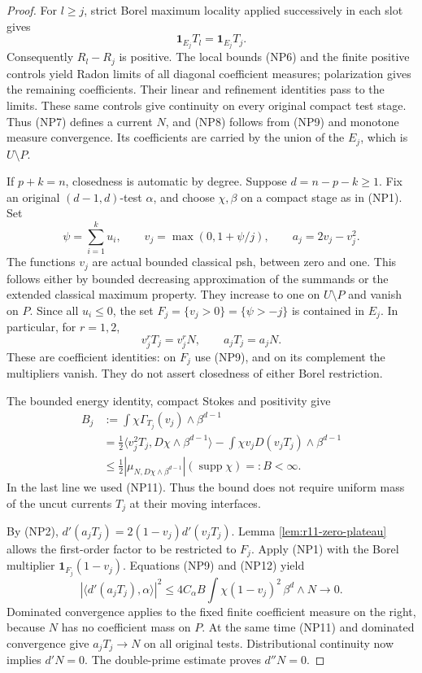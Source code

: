 \begin{proof}
For $l\geq j$, strict Borel maximum locality applied successively in
each slot gives
\[
                       \mathbf1_{E_j}T_l=\mathbf1_{E_j}T_j.
 \tag{NP9}
\]
Consequently $R_l-R_j$ is positive.  The local bounds (NP6) and the
finite positive controls yield Radon limits of all diagonal coefficient
measures; polarization gives the remaining coefficients.  Their linear
and refinement identities pass to the limits.  These same controls
give continuity on every original compact test stage.  Thus (NP7)
defines a current $N$, and (NP8) follows from (NP9) and monotone
measure convergence.  Its coefficients are carried by the union
of the $E_j$, which is $U\setminus P$.

If $p+k=n$, closedness is automatic by degree.  Suppose
$d=n-p-k\geq1$.  Fix an original $(d-1,d)$-test $\alpha$,
and choose $\chi,\beta$ on a compact stage as in (NP1).  Set
\[
 \psi=\sum_{i=1}^k u_i,\qquad
 v_j=\max(0,1+\psi/j),\qquad a_j=2v_j-v_j^2.
 \tag{NP10}
\]
The functions $v_j$ are actual bounded classical psh, between zero
and one.  This follows either by bounded decreasing approximation of
the summands or the extended classical maximum property.  They
increase to one on $U\setminus P$ and vanish on $P$.
Since all $u_i\leq0$, the set $F_j=\{v_j>0\}=\{\psi>-j\}$
is contained in $E_j$.  In particular, for $r=1,2$,
\[
 v_j^rT_j=v_j^rN,\qquad a_jT_j=a_jN.
 \tag{NP11}
\]
These are coefficient identities: on $F_j$ use (NP9), and on its
complement the multipliers vanish.  They do not assert closedness of
either Borel restriction.

The bounded energy identity, compact Stokes and positivity give
\begin{align*}
 B_j&:=\int\chi\Gamma_{T_j}(v_j)\wedge\beta^{d-1}\\
 &=\tfrac12\langle v_j^2T_j,D\chi\wedge\beta^{d-1}\rangle
      -\int\chi v_jD(v_jT_j)\wedge\beta^{d-1}\\
 &\leq\tfrac12|\mu_{N,D\chi\wedge\beta^{d-1}}|
                      (\operatorname{supp}\chi)=:B<\infty.
 \tag{NP12}
\end{align*}
In the last line we used (NP11).  Thus the bound does not require
uniform mass of the uncut currents $T_j$ at their moving interfaces.

By (NP2), $d'(a_jT_j)=2(1-v_j)d'(v_jT_j)$.  Lemma
\ref{lem:r11-zero-plateau} allows the first-order factor to be
restricted to $F_j$.  Apply (NP1) with the Borel multiplier
$\mathbf1_{F_j}(1-v_j)$.  Equations (NP9) and (NP12) yield
\[
 |\langle d'(a_jT_j),\alpha\rangle|^2
 \leq4C_\alpha B
       \int\chi(1-v_j)^2\,\beta^d\wedge N
                       \longrightarrow0.
 \tag{NP13}
\]
Dominated convergence applies to the fixed finite coefficient measure
on the right, because $N$ has no coefficient mass on $P$.
At the same time (NP11) and dominated convergence give $a_jT_j\to N$
on all original tests.  Distributional continuity now implies
$d'N=0$.  The double-prime estimate proves $d''N=0$.


\end{proof}
